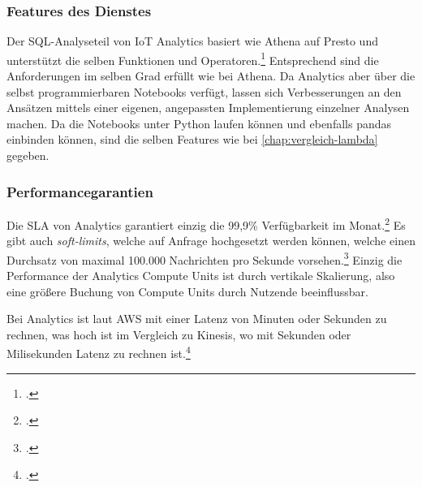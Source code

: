\subsubsection{Features des Dienstes}
Der \ac{SQL}-Analyseteil von IoT Analytics basiert wie Athena auf Presto und unterstützt die selben Funktionen und Operatoren.\footcite[Vgl.][]{AmazonWebServicesInc..o.J.au} Entsprechend sind die Anforderungen im selben Grad erfüllt wie bei Athena. Da \AWSIOT{} Analytics aber über die selbst programmierbaren Notebooks verfügt, lassen sich Verbesserungen an den Ansätzen mittels einer eigenen, angepassten Implementierung einzelner Analysen machen.
Da die Notebooks unter Python laufen können und ebenfalls pandas einbinden können, sind die selben Features wie bei \autoref{chap:vergleich-lambda} gegeben.

\subsubsection{Performancegarantien}
Die \ac{SLA} von \AWSIOT{} Analytics garantiert einzig die 99,9\% Verfügbarkeit im Monat.\footcite[Vgl.][]{AmazonWebServicesInc..2019f} Es gibt auch \textit{soft-limits}, welche auf Anfrage hochgesetzt werden können, welche einen Durchsatz von maximal 100.000 Nachrichten pro Sekunde vorsehen.\footcite[Vgl][]{AmazonWebServicesInc..o.J.av} Einzig die Performance der Analytics Compute Units ist durch vertikale Skalierung, also eine größere Buchung von Compute Units durch Nutzende beeinflussbar.

Bei \AWSIOT{} Analytics ist laut \ac{AWS} mit einer Latenz von Minuten oder Sekunden zu rechnen, was hoch ist im Vergleich zu Kinesis, wo mit Sekunden oder Milisekunden Latenz zu rechnen ist.\footcite[Vgl.][]{AmazonWebServicesInc..o.J.ax}

